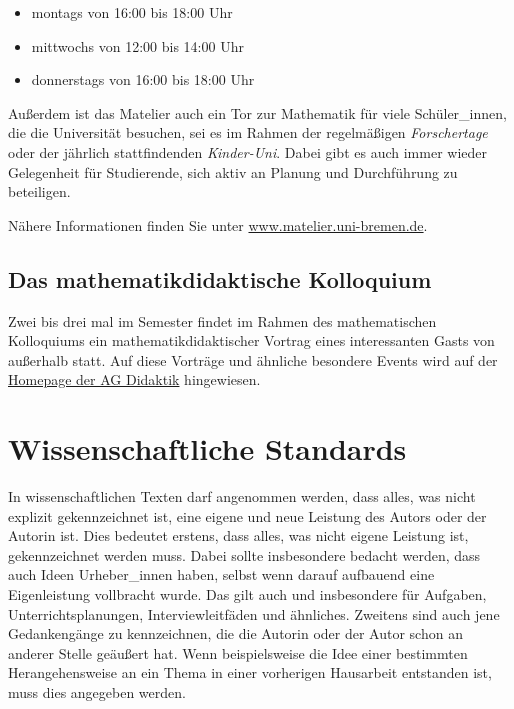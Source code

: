 \documentclass[ngerman,oneside,12pt,a4paper]{scrbook}
\begin{document}
\begin{itemize}
\item
  montags von 16:00 bis 18:00 Uhr
\item
  mittwochs von 12:00 bis 14:00 Uhr
\item
  donnerstags von 16:00 bis 18:00 Uhr
\end{itemize}

Außerdem ist das Matelier auch ein Tor zur Mathematik für viele
Schüler\_innen, die die Universität besuchen, sei es im Rahmen der
regelmäßigen \emph{Forschertage} oder der jährlich stattfindenden
\emph{Kinder-Uni}. Dabei gibt es auch immer wieder Gelegenheit für
Studierende, sich aktiv an Planung und Durchführung zu beteiligen.

Nähere Informationen finden Sie unter
\href{https://www.matelier.uni-bremen.de}{www.matelier.uni-bremen.de}.

\section{Das mathematikdidaktische
Kolloquium}\label{das-mathematikdidaktische-kolloquium}

Zwei bis drei mal im Semester findet im Rahmen des mathematischen
Kolloquiums ein mathematikdidaktischer Vortrag eines interessanten Gasts
von außerhalb statt. Auf diese Vorträge und ähnliche besondere Events
wird auf der \href{http://www.math.uni-bremen.de/didaktik/}{Homepage der
AG Didaktik} hingewiesen.

\chapter{Wissenschaftliche Standards}\label{wissenschaftliche-standards}

In wissenschaftlichen Texten darf angenommen werden, dass alles, was
nicht explizit gekennzeichnet ist, eine eigene und neue Leistung des
Autors oder der Autorin ist. Dies bedeutet erstens, dass alles, was
nicht eigene Leistung ist, gekennzeichnet werden muss. Dabei sollte
insbesondere bedacht werden, dass auch Ideen Urheber\_innen haben,
selbst wenn darauf aufbauend eine Eigenleistung vollbracht wurde. Das
gilt auch und insbesondere für Aufgaben, Unterrichtsplanungen,
Interviewleitfäden und ähnliches. Zweitens sind auch jene Gedankengänge
zu kennzeichnen, die die Autorin oder der Autor schon an anderer Stelle
geäußert hat. Wenn beispielsweise die Idee einer bestimmten
Herangehensweise an ein Thema in einer vorherigen Hausarbeit entstanden
ist, muss dies angegeben werden.
\end{document}
